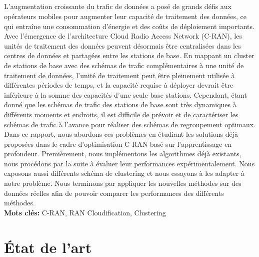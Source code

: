 \documentclass{report}
\begin{document}
    \paragraph{}
  \Large{
    L'augmentation croissante du trafic de données a posé de grands défis aux opérateurs mobiles pour augmenter leur capacité de traitement des données, 
    ce qui entraîne une consommation d'énergie et des coûts de déploiement importants. Avec l'émergence de l'architecture Cloud Radio Access Network (C-RAN), 
    les unités de traitement des données peuvent désormais être centralisées dans les centres de données et partagées entre les stations de base. En mappant 
    un cluster de stations de base avec des schémas de trafic complémentaires à une unité de traitement de données, l'unité de traitement peut être pleinement 
    utilisée à différentes périodes de temps, et la capacité requise à déployer devrait être inférieure à la somme des capacités d'une seule base stations. 
    Cependant, étant donné que les schémas de trafic des stations de base sont très dynamiques à différents moments et endroits, il est difficile de prévoir 
    et de caractériser les schémas de trafic à l'avance pour réaliser des schémas de regroupement optimaux. Dans ce rapport, nous abordons ces problèmes en 
    étudiant les solutions déjà proposées dans le cadre d'optimisation C-RAN basé sur l'apprentissage en profondeur. Premièrement, nous implémentons les algorithmes
    déjà existants, nous procédons par la suite à évaluer leur performances expérimentalement. Nous exposons aussi différents schéma de clustering et nous essayons à les adapter à notre problème. 
    Nous terminons par appliquer les nouvelles méthodes sur des données réelles afin de pouvoir comparer les performances des différents méthodes. \\[2cm]
  \textbf{Mots clés: }
  C-RAN, RAN Cloudification, Clustering
  }
  

  \tableofcontents
   


  \newpage
  \chapter{État de l'art}
  


  

  
\end{document}
